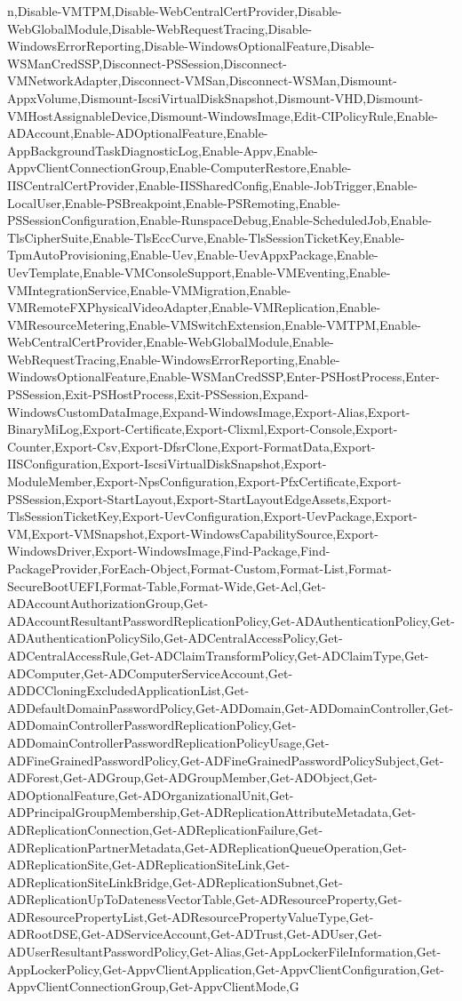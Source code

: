{{n,Disable-VMTPM,Disable-WebCentralCertProvider,Disable-WebGlobalModule,Disable-WebRequestTracing,Disable-WindowsErrorReporting,Disable-WindowsOptionalFeature,Disable-WSManCredSSP,Disconnect-PSSession,Disconnect-VMNetworkAdapter,Disconnect-VMSan,Disconnect-WSMan,Dismount-AppxVolume,Dismount-IscsiVirtualDiskSnapshot,Dismount-VHD,Dismount-VMHostAssignableDevice,Dismount-WindowsImage,Edit-CIPolicyRule,Enable-ADAccount,Enable-ADOptionalFeature,Enable-AppBackgroundTaskDiagnosticLog,Enable-Appv,Enable-AppvClientConnectionGroup,Enable-ComputerRestore,Enable-IISCentralCertProvider,Enable-IISSharedConfig,Enable-JobTrigger,Enable-LocalUser,Enable-PSBreakpoint,Enable-PSRemoting,Enable-PSSessionConfiguration,Enable-RunspaceDebug,Enable-ScheduledJob,Enable-TlsCipherSuite,Enable-TlsEccCurve,Enable-TlsSessionTicketKey,Enable-TpmAutoProvisioning,Enable-Uev,Enable-UevAppxPackage,Enable-UevTemplate,Enable-VMConsoleSupport,Enable-VMEventing,Enable-VMIntegrationService,Enable-VMMigration,Enable-VMRemoteFXPhysicalVideoAdapter,Enable-VMReplication,Enable-VMResourceMetering,Enable-VMSwitchExtension,Enable-VMTPM,Enable-WebCentralCertProvider,Enable-WebGlobalModule,Enable-WebRequestTracing,Enable-WindowsErrorReporting,Enable-WindowsOptionalFeature,Enable-WSManCredSSP,Enter-PSHostProcess,Enter-PSSession,Exit-PSHostProcess,Exit-PSSession,Expand-WindowsCustomDataImage,Expand-WindowsImage,Export-Alias,Export-BinaryMiLog,Export-Certificate,Export-Clixml,Export-Console,Export-Counter,Export-Csv,Export-DfsrClone,Export-FormatData,Export-IISConfiguration,Export-IscsiVirtualDiskSnapshot,Export-ModuleMember,Export-NpsConfiguration,Export-PfxCertificate,Export-PSSession,Export-StartLayout,Export-StartLayoutEdgeAssets,Export-TlsSessionTicketKey,Export-UevConfiguration,Export-UevPackage,Export-VM,Export-VMSnapshot,Export-WindowsCapabilitySource,Export-WindowsDriver,Export-WindowsImage,Find-Package,Find-PackageProvider,ForEach-Object,Format-Custom,Format-List,Format-SecureBootUEFI,Format-Table,Format-Wide,Get-Acl,Get-ADAccountAuthorizationGroup,Get-ADAccountResultantPasswordReplicationPolicy,Get-ADAuthenticationPolicy,Get-ADAuthenticationPolicySilo,Get-ADCentralAccessPolicy,Get-ADCentralAccessRule,Get-ADClaimTransformPolicy,Get-ADClaimType,Get-ADComputer,Get-ADComputerServiceAccount,Get-ADDCCloningExcludedApplicationList,Get-ADDefaultDomainPasswordPolicy,Get-ADDomain,Get-ADDomainController,Get-ADDomainControllerPasswordReplicationPolicy,Get-ADDomainControllerPasswordReplicationPolicyUsage,Get-ADFineGrainedPasswordPolicy,Get-ADFineGrainedPasswordPolicySubject,Get-ADForest,Get-ADGroup,Get-ADGroupMember,Get-ADObject,Get-ADOptionalFeature,Get-ADOrganizationalUnit,Get-ADPrincipalGroupMembership,Get-ADReplicationAttributeMetadata,Get-ADReplicationConnection,Get-ADReplicationFailure,Get-ADReplicationPartnerMetadata,Get-ADReplicationQueueOperation,Get-ADReplicationSite,Get-ADReplicationSiteLink,Get-ADReplicationSiteLinkBridge,Get-ADReplicationSubnet,Get-ADReplicationUpToDatenessVectorTable,Get-ADResourceProperty,Get-ADResourcePropertyList,Get-ADResourcePropertyValueType,Get-ADRootDSE,Get-ADServiceAccount,Get-ADTrust,Get-ADUser,Get-ADUserResultantPasswordPolicy,Get-Alias,Get-AppLockerFileInformation,Get-AppLockerPolicy,Get-AppvClientApplication,Get-AppvClientConfiguration,Get-AppvClientConnectionGroup,Get-AppvClientMode,G}}
